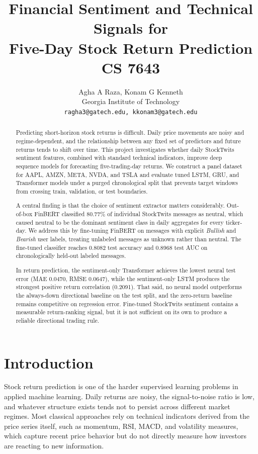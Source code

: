 \documentclass[10pt,twocolumn]{article}
\title{\textbf{Financial Sentiment and Technical Signals for\\
Five-Day Stock Return Prediction} \\[0.5em]
\large CS 7643}
\author{
Agha A Raza, Konam G Kenneth \\
Georgia Institute of Technology \\
\texttt{ragha3@gatech.edu, kkonam3@gatech.edu}
}
\date{}
\begin{document}
\maketitle

\begin{abstract}
\small
Predicting short-horizon stock returns is difficult. Daily price movements are noisy and regime-dependent, and the relationship between any fixed set of predictors and future returns tends to shift over time. This project investigates whether daily StockTwits sentiment features, combined with standard technical indicators, improve deep sequence models for forecasting five-trading-day returns. We construct a panel dataset for AAPL, AMZN, META, NVDA, and TSLA and evaluate tuned LSTM, GRU, and Transformer models under a purged chronological split that prevents target windows from crossing train, validation, or test boundaries.

A central finding is that the choice of sentiment extractor matters considerably. Out-of-box FinBERT classified 80.77\% of individual StockTwits messages as neutral, which caused neutral to be the dominant sentiment class in daily aggregates for every ticker-day. We address this by fine-tuning FinBERT on messages with explicit \textit{Bullish} and \textit{Bearish} user labels, treating unlabeled messages as unknown rather than neutral. The fine-tuned classifier reaches 0.8082 test accuracy and 0.8968 test AUC on chronologically held-out labeled messages.

In return prediction, the sentiment-only Transformer achieves the lowest neural test error (MAE 0.0470, RMSE 0.0647), while the sentiment-only LSTM produces the strongest positive return correlation (0.2091). That said, no neural model outperforms the always-down directional baseline on the test split, and the zero-return baseline remains competitive on regression error. Fine-tuned StockTwits sentiment contains a measurable return-ranking signal, but it is not sufficient on its own to produce a reliable directional trading rule.
\end{abstract}
\vspace{1em}

\section{Introduction}

Stock return prediction is one of the harder supervised learning problems in applied machine learning. Daily returns are noisy, the signal-to-noise ratio is low, and whatever structure exists tends not to persist across different market regimes. Most classical approaches rely on technical indicators derived from the price series itself, such as momentum, RSI, MACD, and volatility measures, which capture recent price behavior but do not directly measure how investors are reacting to new information.
\end{document}
